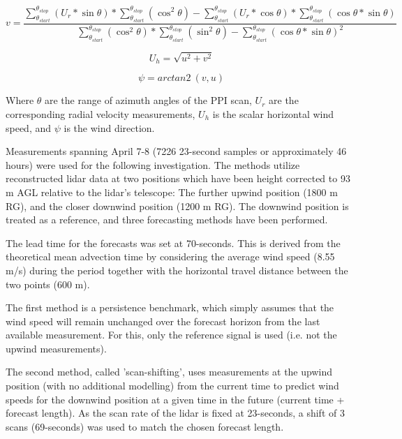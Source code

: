 \begin{equation}
    v = \frac{\sum_{\theta_{start}}^{\theta_{stop}} (U_r*\sin \theta ) * \sum_{\theta_{start}}^{\theta_{stop}} (\cos^2 \theta )-\sum_{\theta_{start}}^{\theta_{stop}} (U_r*\cos \theta ) * \sum_{\theta_{start}}^{\theta_{stop}} (\cos \theta  * \sin \theta )}
    {\sum_{\theta_{start}}^{\theta_{stop}} (\cos^2 \theta )*\sum_{\theta_{start}}^{\theta_{stop}} (\sin^2 \theta ) - \sum_{\theta_{start}}^{\theta_{stop}} (\cos \theta  * \sin \theta )^2}
    \label{eq:ivap_equation_v}
\end{equation}

\begin{equation}
    U_h = \sqrt{u^2 + v^2}
    \label{eq:wsp}
\end{equation}

\begin{equation}
    \psi = arctan2\: (v,u)
    \label{eq:wdir}
\end{equation}

Where $\theta$ are the range of azimuth angles of the PPI scan, $U_r$ are the corresponding radial velocity measurements, $U_h$ is the scalar horizontal wind speed, and $\psi$ is the wind direction.

Measurements spanning April 7-8 (7226 23-second samples or approximately 46 hours) were used for the following investigation. The methods utilize reconstructed lidar data at two positions which have been height corrected to 93 m AGL relative to the lidar's telescope: The further upwind position (1800 m RG), and the closer downwind position (1200 m RG). The downwind position is treated as a reference, and three forecasting methods have been performed.

The lead time for the forecasts was set at 70-seconds. This is derived from the theoretical mean advection time by considering the average wind speed (8.55 m/s) during the period together with the horizontal travel distance between the two points (600 m). 

The first method is a persistence benchmark, which simply assumes that the wind speed will remain unchanged over the forecast horizon from the last available measurement. For this, only the reference signal is used (i.e. not the upwind measurements).

The second method, called 'scan-shifting', uses measurements at the upwind position (with no additional modelling) from the current time to predict wind speeds for the downwind position at a given time in the future (current time + forecast length). As the scan rate of the lidar is fixed at 23-seconds, a shift of 3 scans (69-seconds) was used to match the chosen forecast length.

